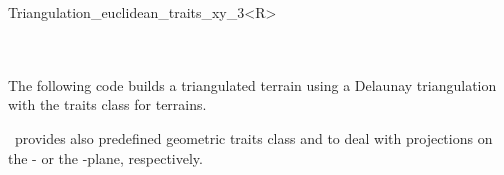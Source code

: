 \begin{ccRefClass}{Triangulation_euclidean_traits_xy_3<R>}
\ccSeeAlso
{} \\
 \\
\\


\ccExample
The following code builds a triangulated terrain
using a Delaunay triangulation with the traits class for 
terrains.


\cgal\ provides also predefined geometric traits class
 and
 to
deal with projections on the
 - or  the -plane,
respectively.

\\


\end{ccRefClass}


